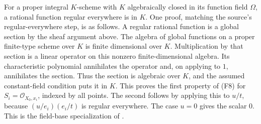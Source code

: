 For a proper integral \(K\)-scheme with \(K\) algebraically closed
in its function field \(\Omega\), a rational function regular
everywhere is in \(K\).
One proof, matching the source's regular-everywhere step, is as follows.
A regular rational function is a global section by the sheaf
argument above.  The algebra of global functions on a proper
finite-type scheme over \(K\) is finite dimensional over \(K\).
Multiplication by that section is a linear operator on this
nonzero finite-dimensional algebra.
Its characteristic polynomial annihilates the operator and,
on applying to \(1\), annihilates the section.
Thus the section is algebraic over \(K\), and the assumed
constant-field condition puts it in \(K\).
This proves the first property of (F8) for
\(S_i=\mathcal O_{X_0,x_i}\), indexed by all points.
The second follows by applying this to \(u/t\), because
\((u/e_i)(e_i/t)\) is regular everywhere.
The case \(u=0\) gives the scalar \(0\).
This is the field-base specialization of
.

